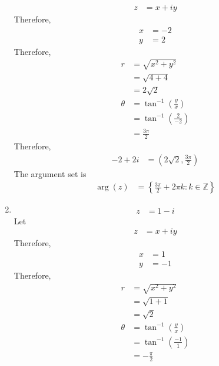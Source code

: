 \documentclass[fleqn, a4paper, 11pt, oneside]{amsart}
\theoremstyle{definition}
\theoremstyle{theorem}
\begin{document}
\begin{solution}
\begin{enumerate}[leftmargin=*]
\begin{align*}
				z & = x + i y
			\end{align*}
			Therefore,
			\begin{align*}
				x & = -2 \\
				y & = 2
			\end{align*}
			Therefore,
			\begin{align*}
				r      & = \sqrt{x^2 + y^2}                     \\
                                       & = \sqrt{4 + 4}                         \\
                                       & = 2 \sqrt{2}                           \\
				\theta & = \tan^{-1}\left( \frac{y}{x} \right)  \\
                                       & = \tan^{-1}\left( \frac{2}{-2} \right) \\
                                       & = \frac{3 \pi}{2}
			\end{align*}
			Therefore,
			\begin{align*}
				-2 + 2 i & = \left( 2 \sqrt{2} , \frac{3 \pi}{2} \right)
			\end{align*}
			The argument set is
			\begin{align*}
				\arg(z) & = \left\{ \frac{3 \pi}{2} + 2 \pi k : k \in \mathbb{Z} \right\}
			\end{align*}
		\item
			\begin{align*}
				z & = 1 - i
			\end{align*}
			Let
			\begin{align*}
				z & = x + i y
			\end{align*}
			Therefore,
			\begin{align*}
				x & = 1 \\
				y & = -1
			\end{align*}
			Therefore,
			\begin{align*}
				r      & = \sqrt{x^2 + y^2}                     \\
                                       & = \sqrt{1 + 1}                         \\
                                       & = \sqrt{2}                             \\
				\theta & = \tan^{-1}\left( \frac{y}{x} \right)  \\
                                       & = \tan^{-1}\left( \frac{-1}{1} \right) \\
                                       & = -\frac{\pi}{2}

\end{align*}
\end{enumerate}
\end{solution}
\end{document}
